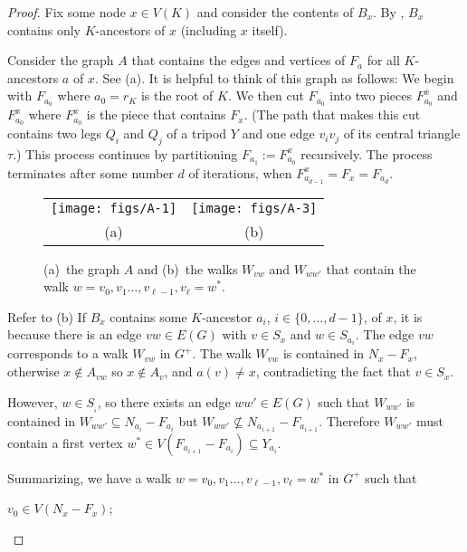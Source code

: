 \documentclass{patmorin}
\begin{document}
\begin{proof}
  Fix some node $x\in V(K)$ and consider the contents of $B_x$.  By , $B_x$ contains only $K$-ancestors of $x$ (including $x$ itself). 
  
  Consider the graph $A$ that contains the edges and vertices of $F_{a}$ for all $K$-ancestors $a$ of $x$. See (a).  It is helpful to think of this graph as follows:  We begin with $F_{a_0}$ where $a_0=r_K$ is the root of $K$.  We then cut $F_{a_0}$ into two pieces $F^{\bar{x}}_{a_0}$ and $F^x_{a_0}$ where $F^x_{a_0}$ is the piece that contains $F_x$. (The path that makes this cut contains two legs $Q_i$ and $Q_j$ of a tripod $Y$ and one edge $v_iv_j$ of its central triangle $\tau$.)  This process continues by partitioning $F_{a_1}:=F^x_{a_0}$ recursively.  The process terminates after some number $d$ of iterations, when $F^x_{a_{d-1}}=F_x=F_{a_d}$.

  \begin{figure}
    
    \begin{center}
      \begin{tabular}{cc}
        \texttt{[image: figs/A-1]} &
        \texttt{[image: figs/A-3]} \\ (a) & (b)
      \end{tabular}
    \end{center}
    \caption{(a)~the graph $A$ and (b)~the walks $W_{vw}$ and $W_{ww'}$ that contain the walk $w=v_0,v_1\ldots,v_{\ell-1},v_\ell=w^*$.}
  \end{figure}

  Refer to (b)
  If $B_x$ contains some $K$-ancestor $a_i$, $i\in\{0,\ldots,d-1\}$, of $x$, it is because there is an edge $vw\in E(G)$ with $v\in S_x$ and $w\in S_{a_i}$.  The edge $vw$ corresponds to a walk $W_{vw}$ in $G^+$. The walk $W_{vw}$ is contained in $N_x-F_x$, otherwise $x\not\in A_{vw}$ so $x\not\in A_v$, and $a(v)\neq x$, contradicting the fact that $v\in S_x$.
  
  However, $w\in S_{_i}$, so there exists an edge $ww'\in E(G)$ such that   $W_{ww'}$ is contained in $W_{ww'}\subseteq N_{a_i}-F_{a_i}$ but $W_{ww'}\not\subseteq N_{a_{i+1}}-F_{a_{i+1}}$.  Therefore $W_{ww'}$ must contain a first vertex $w^*\in V(F_{a_{i+1}}-F_{a_{i}})\subseteq Y_{a_i}$.

  Summarizing, we have a walk $w=v_0,v_1\ldots,v_{\ell-1},v_\ell=w^*$ in $G^+$ such that
  \begin{compactenum}[(i)]
    \item $v_0\in V(N_x-F_x)$;
    

\end{compactenum}
\end{proof}
\end{document}

